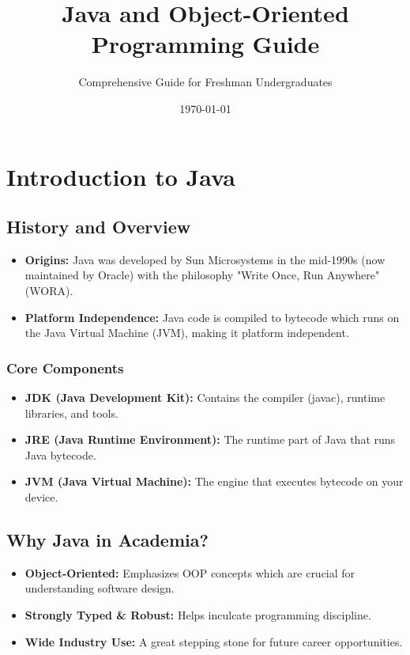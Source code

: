 \documentclass[11pt,a4paper]{article}
\title{Java and Object-Oriented Programming Guide}
\author{Comprehensive Guide for Freshman Undergraduates}
\date{\today}
\begin{document}
\maketitle

\tableofcontents

\section{Introduction to Java}

\subsection{History and Overview}
\begin{itemize}
    \item \textbf{Origins:} Java was developed by Sun Microsystems in the mid-1990s (now maintained by Oracle) with the philosophy "Write Once, Run Anywhere" (WORA).
    \item \textbf{Platform Independence:} Java code is compiled to bytecode which runs on the Java Virtual Machine (JVM), making it platform independent.
\end{itemize}

\subsubsection{Core Components}
\begin{itemize}
    \item \textbf{JDK (Java Development Kit):} Contains the compiler (javac), runtime libraries, and tools.
    \item \textbf{JRE (Java Runtime Environment):} The runtime part of Java that runs Java bytecode.
    \item \textbf{JVM (Java Virtual Machine):} The engine that executes bytecode on your device.
\end{itemize}

\subsection{Why Java in Academia?}
\begin{itemize}
    \item \textbf{Object-Oriented:} Emphasizes OOP concepts which are crucial for understanding software design.
    \item \textbf{Strongly Typed \& Robust:} Helps inculcate programming discipline.
    \item \textbf{Wide Industry Use:} A great stepping stone for future career opportunities.
\end{itemize}
\end{document}
